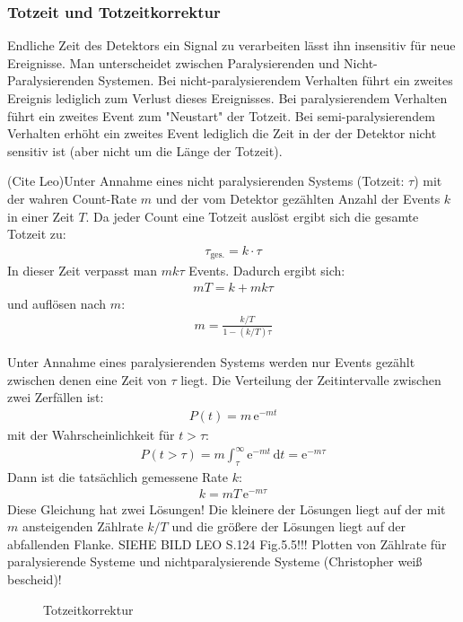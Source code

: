 \documentclass[11pt, a4paper]{article}
\numberwithin{equation}{section}
\begin{document}
\subsubsection{Totzeit und Totzeitkorrektur}
Endliche Zeit des Detektors ein Signal zu verarbeiten lässt ihn insensitiv für neue Ereignisse.
Man unterscheidet zwischen Paralysierenden und Nicht-Paralysierenden Systemen.
Bei nicht-paralysierendem Verhalten führt ein zweites Ereignis lediglich zum Verlust dieses Ereignisses.
Bei paralysierendem Verhalten führt ein zweites Event zum "Neustart" der Totzeit.
Bei semi-paralysierendem Verhalten erhöht ein zweites Event lediglich die Zeit in der der Detektor nicht sensitiv ist (aber nicht um die Länge der Totzeit).

(Cite Leo)Unter Annahme eines nicht paralysierenden Systems (Totzeit: $\tau$) mit der wahren Count-Rate $m$ und der vom Detektor gezählten Anzahl der Events $k$ in einer Zeit $T$.
Da jeder Count eine Totzeit auslöst ergibt sich die gesamte Totzeit zu:
\begin{align}
	\tau_\mathrm{ges.} = k \cdot \tau
\end{align}
In dieser Zeit verpasst man $m k \tau$ Events.
Dadurch ergibt sich:
\begin{align}
	m T = k + m k \tau
\end{align}
und auflösen nach $m$:
\begin{align}
	m = \frac{k / T}{1 - (k/T) \tau}
\end{align}

Unter Annahme eines paralysierenden Systems werden nur Events gezählt zwischen denen eine Zeit von $\tau$ liegt.
Die Verteilung der Zeitintervalle zwischen zwei Zerfällen ist:
\begin{align}
	P(t) = m \, \mathrm{e}^{-m t}
\end{align}
mit der Wahrscheinlichkeit für $t > \tau$:
\begin{align}
	P(t>\tau) = m \int_{\tau}^{\infty} \mathrm{e}^{-m t} \, \mathrm{d}t = \mathrm{e}^{-m \tau}
\end{align}
Dann ist die tatsächlich gemessene Rate $k$:
\begin{align}
	k = m T \, \mathrm{e}^{-m \tau} \label{eq:totzeit_paralysierend}
\end{align}
Diese Gleichung hat zwei Lösungen!
Die kleinere der Lösungen liegt auf der mit $m$ ansteigenden Zählrate $k/T$ und die größere der Lösungen liegt auf der abfallenden Flanke.
SIEHE BILD LEO S.124 Fig.5.5!!!
Plotten von Zählrate für paralysierende Systeme und nichtparalysierende Systeme (Christopher weiß bescheid)!
\begin{figure}[h]
	\centering
	
	\caption{Totzeitkorrektur}
	\label{fig:totzeitkorrektur}
\end{figure}
\end{document}
